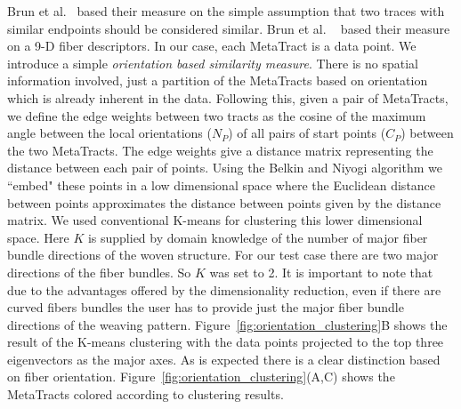 Brun et al.~\cite{Brun2003} based their measure on the simple assumption that two traces with similar endpoints should be considered similar. Brun et al. ~\cite{Brun2004} based their measure on a 9-D fiber descriptors. In our case, each MetaTract is a data point. We introduce a simple \textit{orientation based similarity measure}. There is no spatial information involved, just a partition of the MetaTracts based on orientation which is already inherent in the data.
Following this, given a pair of  MetaTracts, we define the edge weights between two tracts as the cosine of the maximum angle between the local orientations ($N_P$) of all pairs of start points ($C_P$) between the two MetaTracts. The edge weights give a distance matrix representing the distance between each pair of points. Using the Belkin and Niyogi algorithm we ``embed" these points in a low dimensional space where the Euclidean distance between points approximates the distance between points given by the distance matrix. 
%
%  
We used conventional K-means for clustering this lower dimensional space. Here $K$ is supplied by domain knowledge of the number of major fiber bundle directions of the woven structure.
For our test case there are two major directions of the fiber bundles. So $K$ was set to 2. It is important to note that due to the advantages offered by the dimensionality reduction, even if there are curved fibers bundles the user has to provide just the major fiber bundle directions of the weaving pattern. Figure~\ref{fig:orientation_clustering}B shows the result of the K-means clustering with the data points projected to the top three eigenvectors as the major axes. As is expected there is a clear distinction based on fiber orientation. Figure~\ref{fig:orientation_clustering}(A,C) shows the MetaTracts colored according to clustering results.


